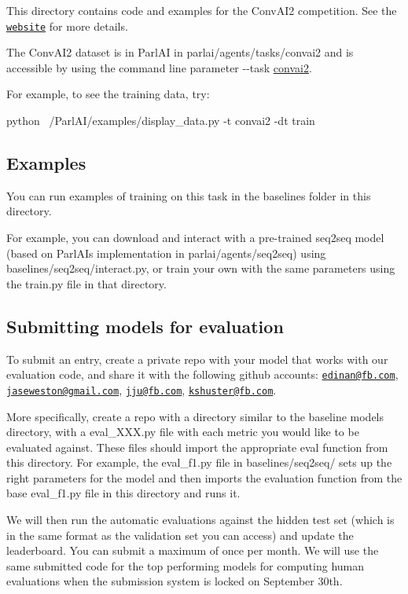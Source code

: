 This directory contains code and examples for the Conv\+A\+I2 competition. See the \href{http://convai.io/}{\tt website} for more details.

The Conv\+A\+I2 dataset is in Parl\+AI in parlai/agents/tasks/convai2 and is accessible by using the command line parameter {\ttfamily -\/-\/task \hyperlink{namespaceconvai2}{convai2}}.

For example, to see the training data, try\+: 
\begin{DoxyCode}
python ~/ParlAI/examples/display\_data.py -t convai2 -dt train
\end{DoxyCode}


\subsection*{Examples}

You can run examples of training on this task in the {\ttfamily baselines} folder in this directory.

For example, you can download and interact with a pre-\/trained seq2seq model (based on Parl\+AI\textquotesingle{}s implementation in parlai/agents/seq2seq) using {\ttfamily baselines/seq2seq/interact.\+py}, or train your own with the same parameters using the {\ttfamily train.\+py} file in that directory.

\subsection*{Submitting models for evaluation}

To submit an entry, create a private repo with your model that works with our evaluation code, and share it with the following github accounts\+: \href{mailto:edinan@fb.com}{\tt edinan@fb.\+com}, \href{mailto:jaseweston@gmail.com}{\tt jaseweston@gmail.\+com}, \href{mailto:jju@fb.com}{\tt jju@fb.\+com}, \href{mailto:kshuster@fb.com}{\tt kshuster@fb.\+com}.

More specifically, create a repo with a directory similar to the baseline models directory, with a {\ttfamily eval\+\_\+\+X\+X\+X.\+py} file with each metric you would like to be evaluated against. These files should import the appropriate eval function from this directory. For example, the {\ttfamily eval\+\_\+f1.\+py} file in {\ttfamily baselines/seq2seq/} sets up the right parameters for the model and then imports the evaluation function from the base {\ttfamily eval\+\_\+f1.\+py} file in this directory and runs it.

We will then run the automatic evaluations against the hidden test set (which is in the same format as the validation set you can access) and update the leaderboard. You can submit a maximum of once per month. We will use the same submitted code for the top performing models for computing human evaluations when the submission system is locked on September 30th.

